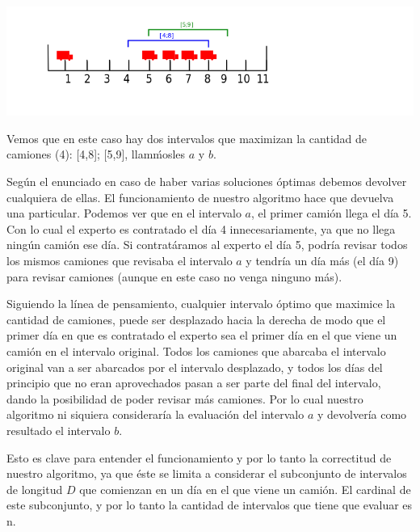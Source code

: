 \vspace{2mm}

\includegraphics[scale=0.75]{images/intervalo2}

\vspace{2mm}

Vemos que en este caso hay dos intervalos que maximizan la cantidad de camiones (4): [4,8]; [5,9], llam\'mosles $a$ y $b$.

\vspace{2mm}

Seg\'un el enunciado en caso de haber varias soluciones \'optimas debemos devolver cualquiera de ellas. El funcionamiento de nuestro algoritmo hace que devuelva una particular.
Podemos ver que en el intervalo $a$, el primer cami\'on llega el d\'ia 5. Con lo cual el experto es contratado el d\'ia 4 innecesariamente, ya que no llega ning\'un cami\'on ese d\'ia. Si contrat\'aramos al experto el d\'ia 5, podr\'ia revisar todos los mismos camiones que revisaba el intervalo $a$ y tendr\'ia un d\'ia m\'as (el d\'ia 9) para revisar camiones (aunque en este caso no venga ninguno m\'as).

\vspace{2mm}

Siguiendo la l\'inea de pensamiento, cualquier intervalo \'optimo que maximice la cantidad de camiones, puede ser desplazado hacia la derecha de modo que el primer d\'ia en que es contratado el experto sea el primer d\'ia en el que viene un cami\'on en el intervalo original. Todos los camiones que abarcaba el intervalo original van a ser abarcados por el intervalo desplazado, y todos los d\'ias del principio que no eran aprovechados pasan a ser parte del final del intervalo, dando la posibilidad de poder revisar m\'as camiones. 
Por lo cual nuestro algoritmo ni siquiera considerar\'ia la evaluaci\'on del intervalo $a$ y devolver\'ia como resultado el intervalo $b$.


\vspace{2mm}

Esto es clave para entender el funcionamiento y por lo tanto la correctitud de nuestro algoritmo, ya que \'este se limita a considerar el subconjunto de intervalos de longitud $D$ que comienzan en un d\'ia en el que viene un cami\'on. El cardinal de este subconjunto, y por lo tanto la cantidad de intervalos que tiene que evaluar es n.


